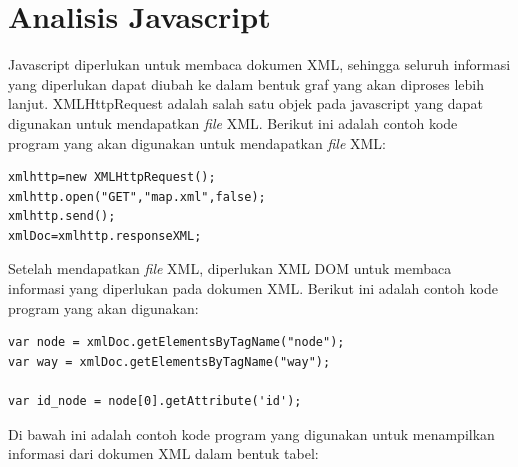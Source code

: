 \section{Analisis Javascript} \label{ssec:analisis_js}
Javascript diperlukan untuk membaca dokumen XML, sehingga seluruh informasi yang
diperlukan dapat diubah ke dalam bentuk graf yang akan diproses lebih lanjut.
XMLHttpRequest adalah salah satu objek pada javascript yang dapat digunakan 
untuk mendapatkan \textit{file} XML. Berikut ini adalah contoh kode
program yang akan digunakan untuk mendapatkan \textit{file} XML:
\begin{verbatim}
xmlhttp=new XMLHttpRequest();
xmlhttp.open("GET","map.xml",false);
xmlhttp.send();
xmlDoc=xmlhttp.responseXML;
\end{verbatim}
Setelah mendapatkan \textit{file} XML, diperlukan XML DOM untuk membaca
informasi yang diperlukan pada dokumen XML. Berikut ini adalah contoh kode
program yang akan digunakan:
\begin{verbatim}
var node = xmlDoc.getElementsByTagName("node");
var way = xmlDoc.getElementsByTagName("way");

var id_node = node[0].getAttribute('id');
\end{verbatim}
Di bawah ini adalah contoh kode program yang digunakan untuk menampilkan
informasi dari dokumen XML dalam bentuk tabel:
